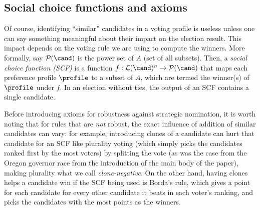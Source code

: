 \subsection{Social choice functions and axioms}\label{appsubsec:axioms}
Of course, identifying ``similar'' candidates in a voting profile is useless unless one can say something meaningful about their impact on the election result. This impact depends on the voting rule we are using to compute the winners. More formally, say $ \mathcal{P}(\cand)$ is the power set of $A$ (set of all subsets). Then, a \textit{social choice function (SCF)} is a function $f: \mathcal{L}(\cand)^n \rightarrow \mathcal{P}(\cand)$ that maps each preference profile $\profile$ to a subset of $A$, which are termed the winner(s) of $\profile$ under $f$. In an election without ties, the output of an SCF contains a single candidate.

Before introducing axioms for robustness against strategic nomination, it is worth noting that for rules that are \emph{not} robust, the exact influence of addition of similar candidates can vary: for example, introducing clones of a candidate can hurt that candidate for an SCF like plurality  voting (which simply picks the candidates ranked first by the most voters) by splitting the vote (as was the case from the Oregon governor race from the introduction of the main body of the paper), making plurality what we call \textit{clone-negative}. On the other hand, having clones helps a candidate win if the SCF being used is Borda's rule, which gives a point for each candidate for every other candidate it beats in each voter's ranking, and picks the candidates with the most points as the winners.


